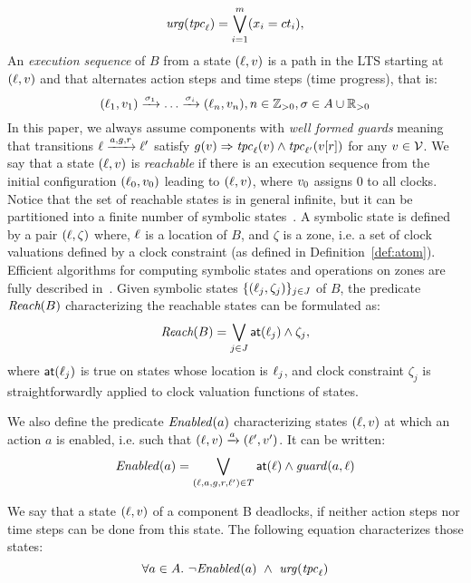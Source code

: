 \begin{displaymath}
\textnormal{\textit{urg}}(\mathit{tpc}_{\ell})=\bigvee_{i=1}^m (x_i=ct_i),
\end{displaymath}
An \emph{execution sequence} of $B$ from a state $(\ell,v)$ is a path in the LTS starting at $(\ell,v)$ and that 
alternates action steps and time steps (time progress), that is:
\begin{displaymath}
  (\ell_1,v_1) \xrightarrow{\sigma_1} \ldots \xrightarrow{\sigma_i} (\ell_n,v_n),n\in\mathbb Z_{> 0},\sigma\in A\cup\mathbb R_{> 0}
\end{displaymath}
In this paper, we always assume components with \emph{well formed guards} meaning that transitions $\ell \xrightarrow{a,g,r} \ell'$ satisfy
$g(v)\Rightarrow\mathit{tpc}_{\ell}(v)\wedge\mathit{tpc}_{\ell'}(v[r])$ for any $v \in \mathcal{V}$.
We say that a state $(\ell,v)$ is \emph{reachable} if there is an execution sequence from the initial configuration $(\ell_0, v_0)$ leading to 
$(\ell,v)$, where $v_0$ assigns $0$ to all clocks.
Notice that the set of reachable states is in general infinite, but it can be partitioned into a finite number of symbolic
states~\cite{tripakis98:thesis,bengtssonY03,henzinger94}.
A symbolic state is defined by a pair $(\ell,\zeta)$ where, 
$\ell$ is a location of $B$, and $\zeta$ is a zone, i.e. a set of clock valuations defined by a clock constraint (as defined in Definition~\ref{def:atom}).
Efficient algorithms for computing symbolic states and operations on zones are fully described in~\cite{bengtssonY03}.
Given symbolic states $\{ (\ell_j,\zeta_j) \}_{j \in J}$ of $B$, the predicate $\textit{Reach}(B)$ characterizing the reachable states can be formulated as:
\begin{displaymath}
 \textit{Reach}(B) = \bigvee_{j \in J} \textnormal{\textsf{at}}(\ell_j) \wedge \zeta_j, 
\end{displaymath}
where $\textnormal{\textsf{at}}(\ell_j)$ is true on states whose location is $\ell_j$, and clock constraint $\zeta_j$ is straightforwardly applied to clock valuation functions of states.

We also define the predicate $\mathit{Enabled}(a)$ characterizing states $(\ell, v)$ at which an action $a$ is enabled, i.e. such that $(\ell,v) \xrightarrow{a} (\ell',v')$. It can be written:
\begin{displaymath}
\mathit{Enabled}(a) = \bigvee_{(\ell,a,g,r,\ell') \in T} \textnormal{\textsf{at}}(\ell)  \wedge \mathit{guard}(a,\ell)
\end{displaymath}


\begin{definition}[Deadlock]
  \label{def:dl}
  We say that a state $(\ell,v)$ of a component B deadlocks,  
  if neither action steps nor time steps can be done from this state. The following equation characterizes those states:
  \vspace{-1mm}
  \begin{displaymath}
   \forall a\in A. \ \neg\enabled(a) \ \wedge \ \urg(\tpc{\loc})
  \end{displaymath}
\end{definition}


